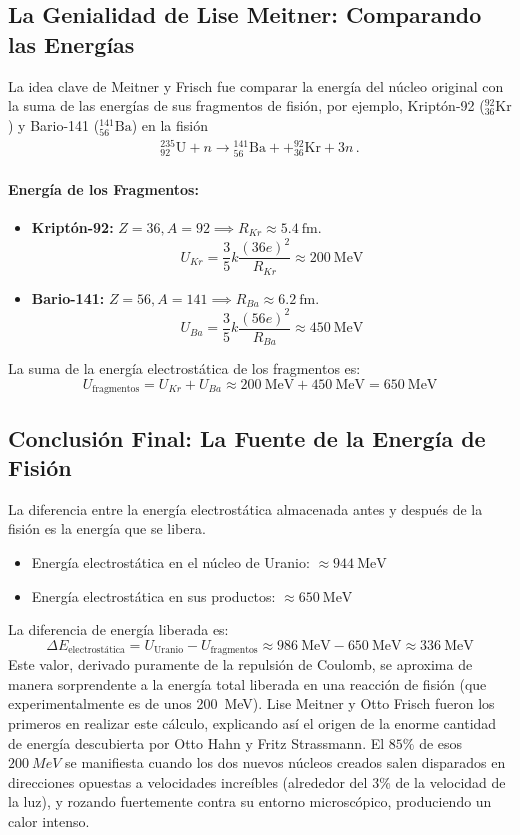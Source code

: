 \documentclass[11pt,a4paper]{book}
\begin{document}
\subsection*{La Genialidad de Lise Meitner: Comparando las Energías}
La idea clave de Meitner y Frisch fue comparar la energía del núcleo original con la suma de las energías de sus fragmentos de fisión, por ejemplo, Kriptón-92 (${}^{92}_{36}\text{Kr}$) y Bario-141 (${}^{141}_{56}\text{Ba}$) en la fisión
\begin{align*}
    {}^{235}_{92}\text{U} + n \to {}^{141}_{56}\text{Ba} + 
    + {}^{92}_{36}\text{Kr} + 3n\,.
\end{align*}

\paragraph{Energía de los Fragmentos:}
\begin{itemize}
    \item \textbf{Kriptón-92:} $Z=36, A=92 \implies R_{Kr} \approx \SI{5.4}{\femto\meter}$.
    \[ U_{Kr} = \frac{3}{5} k \frac{(36e)^2}{R_{Kr}} \approx \SI{200}{\mega\electronvolt} \]
    \item \textbf{Bario-141:} $Z=56, A=141 \implies R_{Ba} \approx \SI{6.2}{\femto\meter}$.
    \[ U_{Ba} = \frac{3}{5} k \frac{(56e)^2}{R_{Ba}} \approx \SI{450}{\mega\electronvolt} \]
\end{itemize}
La suma de la energía electrostática de los fragmentos es:
\[ U_{\text{fragmentos}} = U_{Kr} + U_{Ba} \approx \SI{200}{\mega\electronvolt} + \SI{450}{\mega\electronvolt} = \SI{650}{\mega\electronvolt} \]

\subsection*{Conclusión Final: La Fuente de la Energía de Fisión}
La diferencia entre la energía electrostática almacenada antes y después de la fisión es la energía que se libera.
\begin{itemize}
    \item Energía electrostática en el núcleo de Uranio: $\approx \SI{944}{\mega\electronvolt}$
    \item Energía electrostática en sus productos: $\approx \SI{650}{\mega\electronvolt}$
\end{itemize}
La diferencia de energía liberada es:
\[ \Delta E_{\text{electrostática}} = U_{\text{Uranio}} - U_{\text{fragmentos}} \approx \SI{986}{\mega\electronvolt} - \SI{650}{\mega\electronvolt} \approx \SI{336}{\mega\electronvolt} \]
Este valor, derivado puramente de la repulsión de Coulomb, se aproxima de manera sorprendente a la energía total liberada en una reacción de fisión (que experimentalmente es de unos \SI{200}{\mega\electronvolt}). Lise Meitner y Otto Frisch fueron los primeros en realizar este cálculo, explicando así el origen de la enorme cantidad de energía descubierta por Otto Hahn y Fritz Strassmann. El $85\%$ de esos $\qty{200}{MeV}$
se manifiesta cuando los dos nuevos núcleos creados salen disparados en direcciones opuestas a velocidades increíbles (alrededor del $3\%$ de la velocidad de la luz), y rozando fuertemente contra su entorno microscópico, produciendo un calor intenso.
\end{document}
